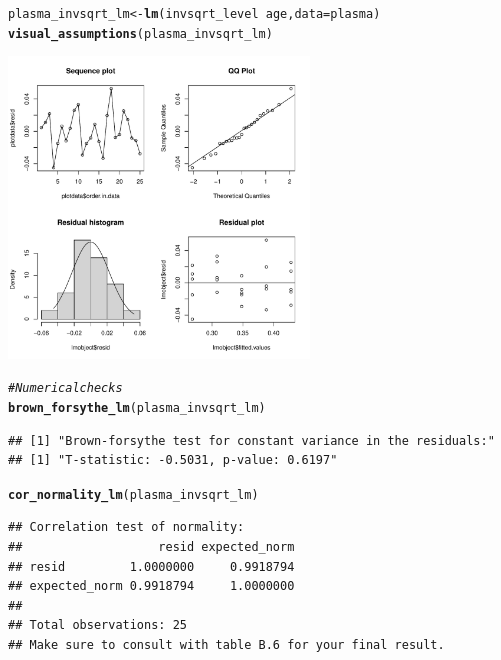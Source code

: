 \documentclass{article}\usepackage[]{graphicx}\usepackage[]{color}
\makeatletter
\newcommand{\hlcom}[1]{\textcolor[rgb]{0.678,0.584,0.686}{\textit{#1}}}%
\newcommand{\hlopt}[1]{\textcolor[rgb]{0,0,0}{#1}}%
\newcommand{\hlstd}[1]{\textcolor[rgb]{0.345,0.345,0.345}{#1}}%
\newcommand{\hlkwb}[1]{\textcolor[rgb]{0.69,0.353,0.396}{#1}}%
\newcommand{\hlkwc}[1]{\textcolor[rgb]{0.333,0.667,0.333}{#1}}%
\newcommand{\hlkwd}[1]{\textcolor[rgb]{0.737,0.353,0.396}{\textbf{#1}}}%
\newenvironment{kframe}{%
 \def\at@end@of@kframe{}%
 \ifinner\ifhmode%
  \def\at@end@of@kframe{\end{minipage}}%
  \begin{minipage}{\columnwidth}%
 \fi\fi%
 \def\FrameCommand##1{\hskip\@totalleftmargin \hskip-\fboxsep
 \colorbox{shadecolor}{##1}\hskip-\fboxsep
     \hskip-\linewidth \hskip-\@totalleftmargin \hskip\columnwidth}%
 \MakeFramed {\advance\hsize-\width
   \@totalleftmargin\z@ \linewidth\hsize
   \@setminipage}}%
 {\par\unskip\endMakeFramed%
 \at@end@of@kframe}
\newenvironment{knitrout}{}{} %
\makeatother
\begin{document}
\begin{knitrout}
\begin{kframe}
\begin{alltt}
\hlstd{plasma_invsqrt_lm} \hlkwb{<-} \hlkwd{lm}\hlstd{(invsqrt_level} \hlopt{~} \hlstd{age,} \hlkwc{data} \hlstd{= plasma)}
\hlkwd{visual_assumptions}\hlstd{(plasma_invsqrt_lm)}
\end{alltt}
\end{kframe}
\includegraphics[width=0.6\textwidth]{figure/unnamed-chunk-1-4} 
\begin{kframe}\begin{alltt}
\hlcom{# Numerical checks}
\hlkwd{brown_forsythe_lm}\hlstd{(plasma_invsqrt_lm)}
\end{alltt}
\begin{verbatim}
## [1] "Brown-forsythe test for constant variance in the residuals:"
## [1] "T-statistic: -0.5031, p-value: 0.6197"
\end{verbatim}
\begin{alltt}
\hlkwd{cor_normality_lm}\hlstd{(plasma_invsqrt_lm)}
\end{alltt}
\begin{verbatim}
## Correlation test of normality:
##                   resid expected_norm
## resid         1.0000000     0.9918794
## expected_norm 0.9918794     1.0000000
## 
## Total observations: 25
## Make sure to consult with table B.6 for your final result.
\end{verbatim}
\end{kframe}
\end{knitrout}
\end{document}
